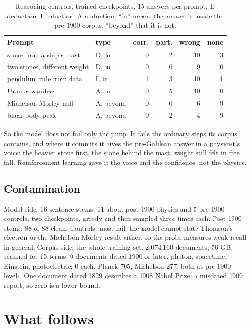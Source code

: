 \documentclass[reprint,prx,amsmath,amssymb,aps,superscriptaddress]{revtex4-2}
\begin{document}
\begin{table}[tb]
\caption{Reasoning controls, trained checkpoints, 15 answers per prompt. D deduction, I induction, A abduction; ``in'' means the answer is inside the pre-1900 corpus, ``beyond'' that it is not.}
\label{tab:controls}
\begin{ruledtabular}
\begin{tabular}{llrrrr}
Prompt & type & corr. & part. & wrong & none \\
\hline
stone from a ship's mast & D, in & 0 & 2 & 10 & 3 \\
two stones, different weight & D, in & 0 & 6 & 9 & 0 \\
pendulum rule from data & I, in & 1 & 3 & 10 & 1 \\
Uranus wanders & A, in & 0 & 5 & 10 & 0 \\
Michelson-Morley null & A, beyond & 0 & 0 & 6 & 9 \\
black-body peak & A, beyond & 0 & 2 & 4 & 9 \\
\end{tabular}
\end{ruledtabular}
\end{table}

So the model does not fail only the jump. It fails the ordinary steps its corpus contains, and where it commits it gives the pre-Galilean answer in a physicist's voice: the heavier stone first, the stone behind the mast, weight still felt in free fall. Reinforcement learning gave it the voice and the confidence, not the physics.

\subsection{Contamination}

Model side: 16 sentence stems, 11 about post-1900 physics and 5 pre-1900 controls, two checkpoints, greedy and then sampled three times each. Post-1900 stems: 88 of 88 clean. Controls: most fail; the model cannot state Thomson's electron or the Michelson-Morley result either, so the probe measures weak recall in general. Corpus side: the whole training set, 2,074,160 documents, 56 GB, scanned for 15 terms. 0 documents dated 1900 or later. photon, spacetime, Einstein, photoelectric: 0 each. Planck 705, Michelson 277, both at pre-1900 levels. One document dated 1829 describes a 1908 Nobel Prize: a misdated 1909 report, so zero is a lower bound.

\section{What follows}
\end{document}
